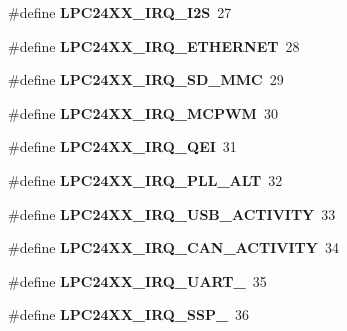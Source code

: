 \begin{DoxyCompactItemize}
\#define {\bfseries L\+P\+C24\+X\+X\+\_\+\+I\+R\+Q\+\_\+\+I2S}~27
\item 
\mbox{\label{group__bsp__interrupt_ga8fdbbee4e8a486b175b7e175cf15b401}} 
\#define {\bfseries L\+P\+C24\+X\+X\+\_\+\+I\+R\+Q\+\_\+\+E\+T\+H\+E\+R\+N\+ET}~28
\item 
\mbox{\label{group__bsp__interrupt_ga31d3a7e4366661a2bcb1f3d39667ef68}} 
\#define {\bfseries L\+P\+C24\+X\+X\+\_\+\+I\+R\+Q\+\_\+\+S\+D\+\_\+\+M\+MC}~29
\item 
\mbox{\label{group__bsp__interrupt_gad5e7c2bfa97e1801185dd10fa2d0e8fc}} 
\#define {\bfseries L\+P\+C24\+X\+X\+\_\+\+I\+R\+Q\+\_\+\+M\+C\+P\+WM}~30
\item 
\mbox{\label{group__bsp__interrupt_gafcadf1a6d779b2beff5227f5305ba85d}} 
\#define {\bfseries L\+P\+C24\+X\+X\+\_\+\+I\+R\+Q\+\_\+\+Q\+EI}~31
\item 
\mbox{\label{group__bsp__interrupt_ga398e90aa4eafc8bef43a9686fa410558}} 
\#define {\bfseries L\+P\+C24\+X\+X\+\_\+\+I\+R\+Q\+\_\+\+P\+L\+L\+\_\+\+A\+LT}~32
\item 
\mbox{\label{group__bsp__interrupt_ga68ecaf3941256eebeace6f438c083624}} 
\#define {\bfseries L\+P\+C24\+X\+X\+\_\+\+I\+R\+Q\+\_\+\+U\+S\+B\+\_\+\+A\+C\+T\+I\+V\+I\+TY}~33
\item 
\mbox{\label{group__bsp__interrupt_ga6e4a43cc72d8c8bcb1aeabb4bc62673f}} 
\#define {\bfseries L\+P\+C24\+X\+X\+\_\+\+I\+R\+Q\+\_\+\+C\+A\+N\+\_\+\+A\+C\+T\+I\+V\+I\+TY}~34
\item 
\mbox{\label{group__bsp__interrupt_ga0f6d037bc3ab750c6898edb852c2bddc}} 
\#define {\bfseries L\+P\+C24\+X\+X\+\_\+\+I\+R\+Q\+\_\+\+U\+A\+R\+T\+\_}~35
\item 
\mbox{\label{group__bsp__interrupt_ga4d924fc3685af8e35d4fd1a8915dffdf}} 
\#define {\bfseries L\+P\+C24\+X\+X\+\_\+\+I\+R\+Q\+\_\+\+S\+S\+P\+\_}~36
\item 
\mbox{\label{group__bsp__interrupt_ga4a86c4c6063469bdaca6e513cac8550e}} 

\end{DoxyCompactItemize}
